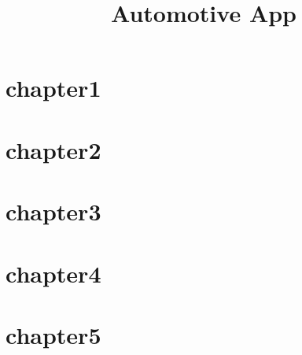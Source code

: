 \documentclass[code,math]{relatorio-deti}
\title{Automotive App}
\begin{document}
\maketitle

\tableofcontents
\clearpage

\chapter{chapter1}

\chapter{chapter2}

\chapter{chapter3}

\chapter{chapter4}

\chapter{chapter5}
\end{document}
